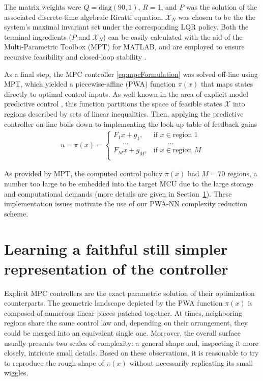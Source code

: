 %
The matrix weights were $Q = \text{diag}(90,1)$, $R = 1$, and $P$ was the solution of the associated discrete-time algebraic Ricatti equation. $\mathcal{X}_N$ was chosen to be the the system's maximal invariant set under the corresponding LQR policy. Both the terminal ingredients ($P$ and $\mathcal{X}_N$) can be easily calculated with the aid of the Multi-Parametric Toolbox (MPT) \cite{mpt} for MATLAB, and are employed to ensure recursive feasibility and closed-loop stability \cite{rawlings2017model}.

As a final step, the MPC controller \eqref{eq:mpcFormulation} was solved off-line using MPT, which yielded a piecewise-affine (PWA) function $\pi(x)$ that maps states directly to optimal control inputs. As well known in the area of explicit model predictive control \cite{alessio2009survey}, this function partitions the space of feasible states $\mathcal{X}$ into regions described by sets of linear inequalities. Then, applying the predictive controller on-line boils down to implementing the look-up table of feedback gains
\begin{align}
	u = \pi(x) = 
	\begin{cases}
		F_1 x + g_1, &\text{if } x \in \text{region } 1 \\
		\quad \; \dots & \qquad \dots \\
		F_M x + g_M, &\text{if } x \in \text{region } M \\
	\end{cases}
	\label{eq.PWA}
\end{align}

As provided by MPT, the computed control policy $\pi(x)$ had $M = 70$ regions, a number too large to be embedded into the target MCU due to the large storage and computational demands (more details are given in Section~\ref{sec.complRed}). These implementation issues motivate the use of our PWA-NN complexity reduction scheme.

\section{Learning a faithful still simpler representation of the controller}
\label{sec.complRed}

Explicit MPC controllers are the exact parametric solution of their optimization counterparts. The geometric landscape depicted by the PWA function $\pi(x)$ is composed of numerous linear pieces patched together. At times, neighboring regions share the same control law and, depending on their arrangement, they could be merged into an equivalent single one. Moreover, the overall surface usually presents two scales of complexity: a general shape and, inspecting it more closely, intricate small details. Based on these observations, it is reasonable to try to reproduce the rough shape of $\pi(x)$ without necessarily replicating its small wiggles.

